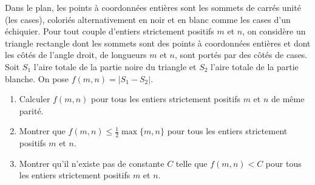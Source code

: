 Dans le plan, les points à coordonnées entières sont les sommets de carrés unité (les cases), coloriés alternativement en noir et en blanc comme les cases d'un échiquier. Pour tout couple d'entiers strictement positifs $m$ et $n$, on considère un triangle rectangle dont les sommets sont des points à coordonnées entières et dont les côtés de l'angle droit, de longueurs $m$ et $n$, sont portés par des côtés de cases. Soit $S_1$ l'aire totale de la partie noire du triangle et $S_2$ l'aire totale de la partie blanche. On pose $f(m,n) = |S_1 - S_2|$.
\begin{enumerate}
\item Calculer $f(m,n)$ pour tous les entiers strictement positifs $m$ et $n$ de même parité.
\item Montrer que $f(m,n) \le \frac{1}{2}\max\{m,n\}$ pour tous les entiers strictement positifs $m$ et $n$.
\item Montrer qu'il n'existe pas de constante $C$ telle que $f(m,n) < C$ pour tous les entiers strictement positifs $m$ et $n$.
\end{enumerate}

